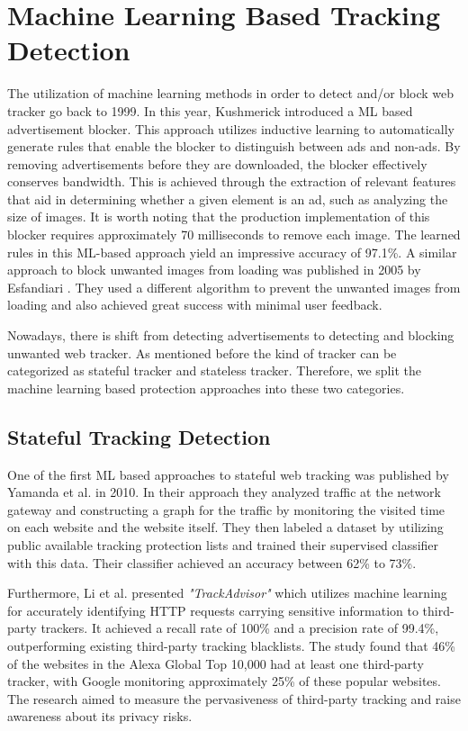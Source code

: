 \section{Machine Learning Based Tracking Detection}

The utilization of machine learning methods in order to detect and/or block web tracker go back to 1999. In this year, Kushmerick \cite{kushmerick1999learning}
introduced a ML based advertisement blocker. This approach utilizes inductive learning to automatically
generate rules that enable the blocker to distinguish between ads and non-ads. By removing advertisements before they are downloaded,
the blocker effectively conserves bandwidth. This is achieved through the extraction of relevant features that aid in determining
whether a given element is an ad, such as analyzing the size of images. It is worth noting that the production implementation of
this blocker requires approximately 70 milliseconds to remove each image. The learned rules in this ML-based approach yield an
impressive accuracy of 97.1\%. A similar approach to block unwanted images from loading was published in 2005 by Esfandiari \cite{esfandiari2005adaptive}.
They used a different algorithm to prevent the unwanted images from loading and also achieved great success with minimal user feedback.

Nowadays, there is shift from detecting advertisements to detecting and blocking unwanted web tracker. As mentioned before 
the kind of tracker can be categorized as stateful tracker and stateless tracker. Therefore, we split the machine learning based
protection approaches into these two categories.

\subsection{Stateful Tracking Detection}

One of the first ML based approaches to stateful web tracking was published by Yamanda et al. \cite{yamada2010web} in 2010.
In their approach they analyzed traffic at the network gateway and constructing a graph for the traffic by monitoring the visited
time on each website and the website itself. They then labeled a dataset by utilizing public available tracking protection lists
and trained their supervised classifier with this data. Their classifier achieved an accuracy between 62\% to 73\%.

Furthermore, Li et al. \cite{li2015trackadvisor} presented \emph{"TrackAdvisor"} which utilizes machine learning for 
accurately identifying HTTP requests carrying sensitive information to third-party trackers. It achieved a recall rate of 100\% and a precision rate of 99.4\%, outperforming
existing third-party tracking blacklists. The study found that 46\% of the websites in the Alexa Global Top 10,000 had at least
one third-party tracker, with Google monitoring approximately 25\% of these popular websites. The research aimed to measure
the pervasiveness of third-party tracking and raise awareness about its privacy risks.

